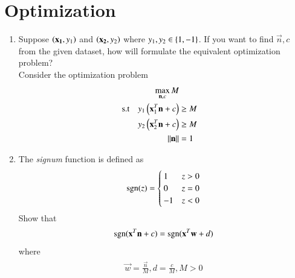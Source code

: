 \documentclass[journal,12pt,twocolumn]{IEEEtran}
\renewcommand\thesection{\arabic{section}}
\begin{document}
\section{Optimization}
\begin{enumerate}[label=\thesection.\arabic*,ref=\thesection.\theenumi]

\item Suppose $\left(\mathbf{x_1},y_1\right)$ and $\left(\mathbf{x_2},y_2\right)$ where $y_1, y_2 \in \left\{1,-1\right\}$. If you want 
to find $\vec{n},c$ from the given dataset, how will formulate the equivalent 
optimization 
problem?
\\
\solution
 Consider the optimization problem
\begin{align}
\label{eq:m_opt}
\max_{\mathbf{n},c}M
\\
\label{eq:m_opt_const1}
\text{s.t} \quad y_1\left(\mathbf{x}_1^T\mathbf{n}+c\right) &\ge M
\\
\label{eq:m_opt_const2}
y_2\left(\mathbf{x}_2^T\mathbf{n}+c\right) &\ge M
\\
\left\Vert\mathbf{n}\right\Vert &= 1
\label{eq:m_opt_end}
\end{align}
\item The {\em signum} function is defined as
\begin{align}
\mathop{\mathrm{sgn}}(z) = 
\begin{cases}
1  & z > 0
\\
0  & z = 0
\\
-1  & z < 0
\end{cases}
\end{align}
Show that
%
\begin{align}
\mathop{\mathrm{sgn}}(\mathbf{x}^T\mathbf{n}+c) = \mathop{\mathrm{sgn}}(\mathbf{x}^T\mathbf{w}+d)
\end{align}
%
where
\begin{align}
\begin{split}
\vec{w} = \frac{\vec{n}}{M}, 
d = \frac{c}{M}, M >0
\end{split}
\label{eq:opt_ntow}
\end{align}


\end{enumerate}
\end{document}
